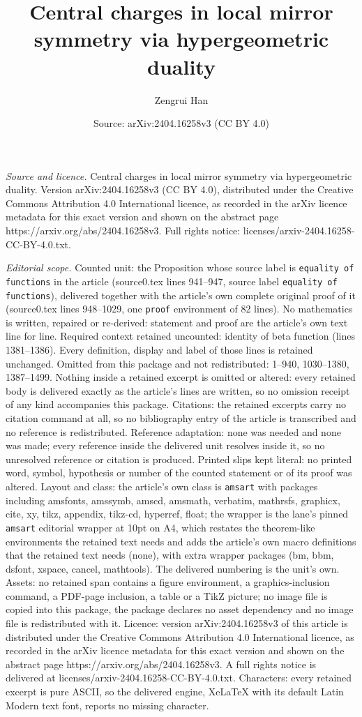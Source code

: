 \documentclass[10pt,a4paper]{amsart}
\title[Central charges in local mirror symmetry via hypergeometric ]{Central charges in local mirror symmetry via hypergeometric duality}
\author{Zengrui Han}
\date{Source: arXiv:2404.16258v3 (CC BY 4.0)}
\begin{document}
\maketitle

\noindent\emph{Source and licence.} Central charges in local mirror symmetry via hypergeometric duality. Version arXiv:2404.16258v3 (CC BY 4.0), distributed under the Creative Commons Attribution 4.0 International licence, as recorded in the arXiv licence metadata for this exact version and shown on the abstract page https://arxiv.org/abs/2404.16258v3. Full rights notice: licenses/arxiv-2404.16258-CC-BY-4.0.txt.\par\smallskip

\noindent\textit{Editorial scope.} Counted unit: the Proposition whose source label is \texttt{equality of functions} in the article (source0.tex lines 941--947, source label \texttt{equality of functions}), delivered together with the article's own complete original proof of it (source0.tex lines 948--1029, one \texttt{proof} environment of 82 lines). No mathematics is written, repaired or re-derived: statement and proof are the article's own text line for line. Required context retained uncounted: identity of beta function (lines 1381--1386). Every definition, display and label of those lines is retained unchanged. Omitted from this package and not redistributed: 1--940, 1030--1380, 1387--1499. Nothing inside a retained excerpt is omitted or altered: every retained body is delivered exactly as the article's lines are written, so no omission receipt of any kind accompanies this package. Citations: the retained excerpts carry no citation command at all, so no bibliography entry of the article is transcribed and no reference is redistributed. Reference adaptation: none was needed and none was made; every reference inside the delivered unit resolves inside it, so no unresolved reference or citation is produced. Printed slips kept literal: no printed word, symbol, hypothesis or number of the counted statement or of its proof was altered. Layout and class: the article's own class is \texttt{amsart} with packages including amsfonts, amssymb, amscd, amsmath, verbatim, mathrsfs, graphicx, cite, xy, tikz, appendix, tikz-cd, hyperref, float; the wrapper is the lane's pinned \texttt{amsart} editorial wrapper at 10pt on A4, which restates the theorem-like environments the retained text needs and adds the article's own macro definitions that the retained text needs (none), with extra wrapper packages (bm, bbm, dsfont, xspace, cancel, mathtools). The delivered numbering is the unit's own. Assets: no retained span contains a figure environment, a graphics-inclusion command, a PDF-page inclusion, a table or a TikZ picture; no image file is copied into this package, the package declares no asset dependency and no image file is redistributed with it. Licence: version arXiv:2404.16258v3 of this article is distributed under the Creative Commons Attribution 4.0 International licence, as recorded in the arXiv licence metadata for this exact version and shown on the abstract page https://arxiv.org/abs/2404.16258v3. A full rights notice is delivered at licenses/arxiv-2404.16258-CC-BY-4.0.txt. Characters: every retained excerpt is pure ASCII, so the delivered engine, XeLaTeX with its default Latin Modern text font, reports no missing character.
\end{document}
